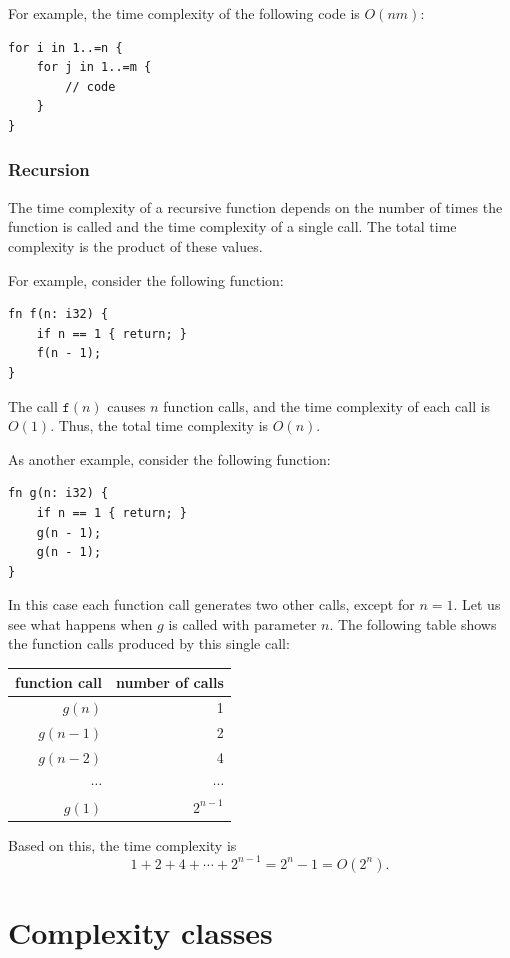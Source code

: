 For example, the time complexity of the
following code is $O(nm)$:

\begin{lstlisting}
for i in 1..=n {
    for j in 1..=m {
        // code
    }
}
\end{lstlisting}

\subsubsection*{Recursion}

The time complexity of a recursive function
depends on the number of times the function is called
and the time complexity of a single call.
The total time complexity is the product of
these values.

For example, consider the following function:
\begin{lstlisting}
fn f(n: i32) {
    if n == 1 { return; }
    f(n - 1);
}
\end{lstlisting}
The call $\texttt{f}(n)$ causes $n$ function calls,
and the time complexity of each call is $O(1)$.
Thus, the total time complexity is $O(n)$.

As another example, consider the following function:
\begin{lstlisting}
fn g(n: i32) {
    if n == 1 { return; }
    g(n - 1);
    g(n - 1);
}
\end{lstlisting}
In this case each function call generates two other
calls, except for $n=1$.
Let us see what happens when $g$ is called
with parameter $n$.
The following table shows the function calls
produced by this single call:
\begin{center}
\begin{tabular}{rr}
function call & number of calls \\
\hline
$g(n)$ & 1 \\
$g(n-1)$ & 2 \\
$g(n-2)$ & 4 \\
$\cdots$ & $\cdots$ \\
$g(1)$ & $2^{n-1}$ \\
\end{tabular}
\end{center}
Based on this, the time complexity is
\[1+2+4+\cdots+2^{n-1} = 2^n-1 = O(2^n).\]

\section{Complexity classes}


